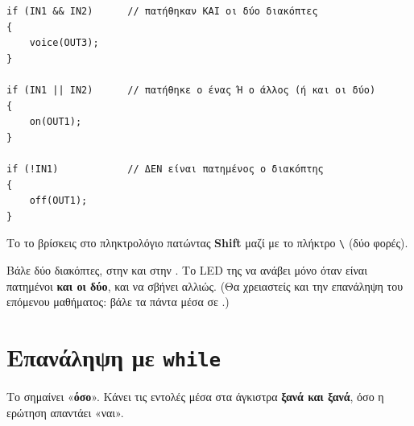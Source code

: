 \documentclass[11pt,a4paper]{article}
\newcommand{\code}[1]{\texttt{\detokenize{#1}}}
\begin{document}
\begin{lstlisting}
if (IN1 && IN2)      // πατήθηκαν ΚΑΙ οι δύο διακόπτες
{
    voice(OUT3);
}

if (IN1 || IN2)      // πατήθηκε ο ένας Ή ο άλλος (ή και οι δύο)
{
    on(OUT1);
}

if (!IN1)            // ΔΕΝ είναι πατημένος ο διακόπτης
{
    off(OUT1);
}
\end{lstlisting}

\begin{tip}
Το \code{||} το βρίσκεις στο πληκτρολόγιο πατώντας \textbf{Shift} μαζί με το πλήκτρο \texttt{\textbackslash} (δύο φορές).
\end{tip}

\begin{challenge}
Βάλε δύο διακόπτες, στην \code{IN1} και στην \code{IN2}. Το LED της \code{OUT1} να ανάβει μόνο όταν είναι
πατημένοι \textbf{και οι δύο}, και να σβήνει αλλιώς. (Θα χρειαστείς και την επανάληψη του επόμενου μαθήματος:
βάλε τα πάντα μέσα σε \code{while (1) { ... }}.)
\end{challenge}

\section{Επανάληψη με \texttt{while}}

Το \code{while} σημαίνει «\textbf{όσο}». Κάνει τις εντολές μέσα στα άγκιστρα \textbf{ξανά και ξανά}, όσο η
ερώτηση απαντάει «ναι».

\begin{center}
\end{center}
\end{document}

